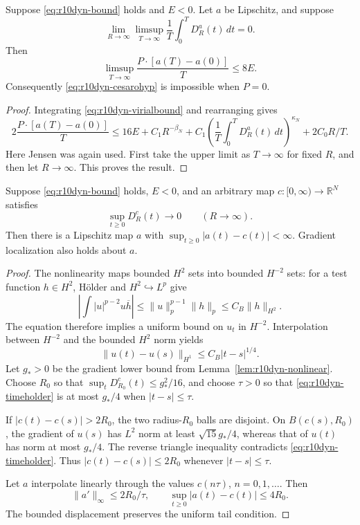 \begin{theorem}
\label{thm:r10dyn-cesaro}
Suppose \eqref{eq:r10dyn-bound} holds and $E<0$. Let $a$ be Lipschitz,
and suppose
\begin{equation}\label{eq:r10dyn-cesarohyp}
 \lim_{R\to\infty}\limsup_{T\to\infty}\frac1T
 \int_0^TD_R^a(t)\,dt=0.
\end{equation}
Then
\begin{equation}\label{eq:r10dyn-drift}
 \limsup_{T\to\infty}\frac{P\cdot[a(T)-a(0)]}{T}\le8E.
\end{equation}
Consequently \eqref{eq:r10dyn-cesarohyp} is impossible when $P=0$.
\end{theorem}
\begin{proof}
Integrating \eqref{eq:r10dyn-virialbound} and rearranging gives
\[
 2\frac{P\cdot[a(T)-a(0)]}{T}
 \le16E+C_1R^{-\beta_N}+
 C_1\left(\frac1T\int_0^TD_R^a(t)\,dt\right)^{\kappa_N}
 +2C_0R/T.
\]
Here Jensen was again used. First take the upper limit as $T\to\infty$
for fixed $R$, and then let $R\to\infty$. This proves the result.
\end{proof}

\begin{lemma}
\label{lem:r10dyn-center}
Suppose \eqref{eq:r10dyn-bound} holds, $E<0$, and an arbitrary map
$c:[0,\infty)\to\mathbb R^N$ satisfies
\begin{equation}\label{eq:r10dyn-uniformtight}
 \sup_{t\ge0}D_R^c(t)\longrightarrow0\qquad(R\to\infty).
\end{equation}
Then there is a Lipschitz map $a$ with
$\sup_{t\ge0}|a(t)-c(t)|<\infty$. Gradient localization also holds
about $a$.
\end{lemma}
\begin{proof}
The nonlinearity maps bounded $H^2$ sets into bounded $H^{-2}$ sets:
for a test function $h\in H^2$, H\"older and $H^2\hookrightarrow L^p$ give
\[
 \left|\int |u|^{p-2}u\overline h\right|
 \le\|u\|_p^{p-1}\|h\|_p\le C_B\|h\|_{H^2}.
\]
The equation therefore implies a uniform bound on $u_t$ in $H^{-2}$.
Interpolation between $H^{-2}$ and the bounded $H^2$ norm yields
\begin{equation}\label{eq:r10dyn-timeholder}
 \|u(t)-u(s)\|_{H^1}\le C_B|t-s|^{1/4}.
\end{equation}
Let $g_*>0$ be the gradient lower bound from
Lemma~\ref{lem:r10dyn-nonlinear}. Choose $R_0$ so that
$\sup_tD_{R_0}^c(t)\le g_*^2/16$, and choose $\tau>0$ so that
\eqref{eq:r10dyn-timeholder} is at most $g_*/4$ when $|t-s|\le\tau$.

If $|c(t)-c(s)|>2R_0$, the two radius-$R_0$ balls are disjoint.
On $B(c(s),R_0)$, the gradient of $u(s)$ has $L^2$ norm at least
$\sqrt{15}g_*/4$, whereas that of $u(t)$ has norm at most $g_*/4$.
The reverse triangle inequality contradicts
\eqref{eq:r10dyn-timeholder}. Thus
$|c(t)-c(s)|\le2R_0$ whenever $|t-s|\le\tau$.

Let $a$ interpolate linearly through the values $c(n\tau)$,
$n=0,1,\ldots$. Then
\[
 \|a'\|_\infty\le2R_0/\tau,\qquad
 \sup_{t\ge0}|a(t)-c(t)|\le4R_0.
\]
The bounded displacement preserves the uniform tail condition.
\end{proof}

